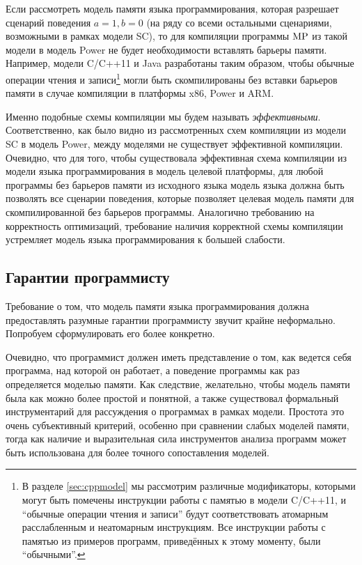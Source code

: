 Если рассмотреть модель памяти языка программирования, которая разрешает сценарий поведения $a=1,b=0$
(на ряду со всеми остальными сценариями, возможными в рамках модели SC), то для компиляции программы
${\rm MP}$ из такой модели в модель Power не будет необходимости вставлять барьеры памяти.
Например, модели C/C++11 \cite{Batty-al:POPL11} и Java \cite{Manson-al:POPL05} разработаны таким образом, чтобы
обычные операции чтения и записи\footnote{В разделе \ref{sec:cppmodel} мы рассмотрим различные модификаторы, которыми могут
быть помечены инструкции работы с памятью в модели C/C++11, и ``обычные операции чтения и записи'' будут соответствовать
атомарным расслабленным и неатомарным инструкциям.
Все инструкции работы с памятью из примеров программ, приведённых к этому моменту, были ``обычными''.}
могли быть скомпилированы без вставки барьеров памяти в случае компиляции в платформы x86, Power и ARM.

Именно подобные схемы компиляции мы будем называть \emph{эффективными}.
Соответственно, как было видно из рассмотренных схем компиляции из модели SC в модель Power, между моделями
не существует эффективной компиляции.
Очевидно, что для того, чтобы существовала эффективная схема компиляции из модели языка программирования в модель
целевой платформы, для любой программы без барьеров памяти из исходного языка модель языка должна быть
позволять все сценарии поведения, которые позволяет целевая модель памяти для скомпилированной без барьеров
программы.
Аналогично требованию на корректность оптимизаций, требование наличия корректной схемы компиляции устремляет
модель языка программирования к большей слабости.


\subsection{Гарантии программисту} %
Требование о том, что модель памяти языка программирования должна предоставлять разумные
гарантии программисту звучит крайне неформально.
Попробуем сформулировать его более конкретно.

Очевидно, что программист должен иметь представление о том, как ведется себя программа, над
которой он работает, а поведение программы как раз определяется моделью памяти.
Как следствие, желательно, чтобы модель памяти была как можно более простой и понятной,
а также существовал формальный инструментарий для рассуждения о программах в рамках модели.
Простота это очень субъективный критерий, особенно при сравнении слабых моделей памяти,
тогда как наличие и выразительная сила инструментов анализа программ может быть
использована для более точного сопоставления моделей.

